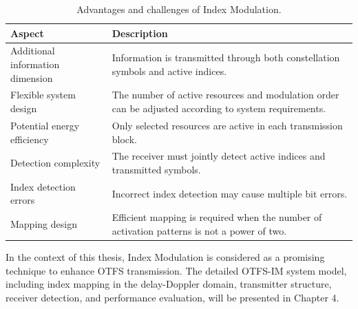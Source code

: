 \begin{table}[H]
\centering
\caption{Advantages and challenges of Index Modulation.}
\label{tab:im_advantages_challenges}

\small
\setlength{\tabcolsep}{6pt}
\begin{tabularx}{0.95\textwidth}{|>{\RaggedRight\arraybackslash}p{}|>{\RaggedRight\arraybackslash}X|}
\hline
\textbf{Aspect} &
\textbf{Description} \\
\hline

Additional information dimension &
Information is transmitted through both constellation symbols and active indices. \\
\hline

Flexible system design &
The number of active resources and modulation order can be adjusted according to system requirements. \\
\hline

Potential energy efficiency &
Only selected resources are active in each transmission block. \\
\hline

Detection complexity &
The receiver must jointly detect active indices and transmitted symbols. \\
\hline

Index detection errors &
Incorrect index detection may cause multiple bit errors. \\
\hline

Mapping design &
Efficient mapping is required when the number of activation patterns is not a power of two. \\
\hline

\end{tabularx}

\end{table}

In the context of this thesis, Index Modulation is considered as a promising technique to enhance OTFS transmission. The detailed OTFS-IM system model, including index mapping in the delay-Doppler domain, transmitter structure, receiver detection, and performance evaluation, will be presented in Chapter 4.
